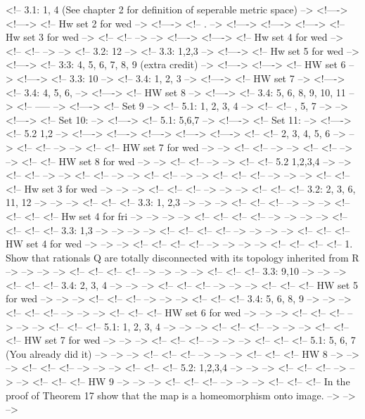\documentclass{amsart}
\numberwithin{equation}{section}
\theoremstyle{definition}
\theoremstyle{remark}
\begin{document}
<!-- 3.1: 1, 4 (See chapter 2 for definition of seperable metric space)   -->
<!---->
<!---->
<!-- Hw set 2 for wed   -->
<!---->
<!-- . -->
<!---->
<!---->
<!---->
<!-- Hw set 3 for wed  -->
<!-- <!--  --> -->
<!---->
<!---->
<!-- Hw set 4 for wed -->
<!-- <!--  --> -->
<!-- 3.2: 12   -->
<!-- 3.3: 1,2,3   -->
<!---->
<!-- Hw set 5 for wed  -->
<!---->
<!-- 3:3: 4, 5, 6, 7, 8, 9 (extra credit)     -->
<!---->
<!---->
<!-- HW set 6 -->
<!---->
<!-- 3.3: 10 -->
<!-- 3.4: 1, 2, 3    -->
<!---->
<!-- HW set 7 -->
<!---->
<!-- 3.4: 4, 5, 6,       -->
<!---->
<!-- HW set 8 -->
<!---->
<!-- 3.4: 5, 6, 8, 9, 10, 11     -->
<!-- -----  -->
<!---->
<!-- Set 9   -->
<!-- 5.1: 1, 2, 3, 4   -->
<!-- <!-- , 5, 7    --> -->
<!---->
<!-- Set 10: -->
<!---->
<!-- 5.1: 5,6,7    -->
<!---->
<!-- Set 11:  -->
<!---->
<!-- 5.2 1,2   -->
<!---->
<!---->
<!---->
<!---->
<!---->
<!-- <!-- 2, 3, 4, 5, 6 --> -->
<!-- <!--  --> -->
<!-- <!-- HW set 7 for wed --> -->
<!-- <!--  --> -->
<!-- <!--  --> -->
<!-- <!-- HW set 8 for wed --> -->
<!-- <!--  --> -->
<!-- <!-- 5.2 1,2,3,4   --> -->
<!-- <!--  --> -->
<!-- <!--  --> -->
<!-- <!--  --> -->
<!-- <!-- <!--  --> --> -->
<!-- <!-- <!-- Hw set 3 for wed --> --> -->
<!-- <!-- <!--  --> --> -->
<!-- <!-- <!-- 3.2: 2, 3, 6, 11, 12   --> --> -->
<!-- <!-- <!-- 3.3: 1, 2,3   --> --> -->
<!-- <!-- <!--  --> --> -->
<!-- <!-- <!-- <!-- Hw set 4 for fri --> --> --> -->
<!-- <!-- <!-- <!--  --> --> --> -->
<!-- <!-- <!-- <!-- 3.3: 1,3 --> --> --> -->
<!-- <!-- <!-- <!--  --> --> --> -->
<!-- <!-- <!-- HW set 4 for wed --> --> -->
<!-- <!-- <!-- <!--  --> --> --> -->
<!-- <!-- <!-- <!-- 1. Show that rationals Q are totally disconnected with its topology inherited from R --> --> --> -->
<!-- <!-- <!-- <!--  --> --> --> -->
<!-- <!-- <!-- 3.3: 9,10   --> --> -->
<!-- <!-- <!-- 3.4: 2, 3, 4 --> --> -->
<!-- <!-- <!--  --> --> -->
<!-- <!-- <!-- HW set 5 for wed --> --> -->
<!-- <!-- <!--  --> --> -->
<!-- <!-- <!-- 3.4: 5, 6, 8, 9 --> --> -->
<!-- <!-- <!--  --> --> -->
<!-- <!-- <!-- HW set 6 for wed --> --> -->
<!-- <!-- <!--  --> --> -->
<!-- <!-- <!-- 5.1: 1, 2, 3, 4 --> --> -->
<!-- <!-- <!--  --> --> -->
<!-- <!-- <!-- HW set 7 for wed --> --> -->
<!-- <!-- <!--  --> --> -->
<!-- <!-- <!-- 5.1: 5, 6, 7   (You already did it) --> --> -->
<!-- <!-- <!--  --> --> -->
<!-- <!-- <!-- HW 8 --> --> -->
<!-- <!-- <!--  --> --> -->
<!-- <!-- <!-- 5.2: 1,2,3,4   --> --> -->
<!-- <!-- <!--  --> --> -->
<!-- <!-- <!-- HW 9 --> --> -->
<!-- <!-- <!--  --> --> -->
<!-- <!-- <!-- In the proof of Theorem 17 show that the map is a homeomorphism onto image. --> --> -->
\end{document}
